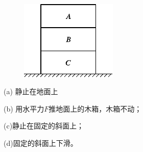 \begin{questions}
  \begin{figurex}
    \centering
     \hspace{4em}
    \setcounter{subfigure}{2}
    \\[1em]
    \setcounter{subfigure}{1}
     \hspace{4em}
    \setcounter{subfigure}{3}
    \caption{}
    \label{fig:03.18}
  \end{figurex}

  \begin{figure}
    \centering
    \includegraphics{figure/fig03.19}
    \caption{}
    \label{fig:03.19}
  \end{figure}
  (a) 静止在地面上

  (b) 用水平力$ F $推地面上的木箱，木箱不动；

  (c)静止在固定的斜面上；

  (d)固定的斜面上下滑。


\end{questions}
